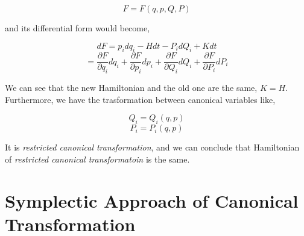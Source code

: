 \documentclass[12pt]{article}
\begin{document}
\begin{center}
    \[ F = F(q, p, Q, P) \]
\end{center}

and its differential form would become,

\begin{center}
    \[ dF = p_idq_i - Hdt - P_idQ_i + Kdt \]
    \[ = \frac{\partial F}{\partial q_i}dq_i + \frac{\partial F}{\partial p_i}dp_i + \frac{\partial F}{\partial Q_i}dQ_i + \frac{\partial F}{\partial P_i}dP_i \]
\end{center}

We can see that the new Hamiltonian and the old one are the same, $K = H$. Furthermore, we have the trasformation between canonical variables like,

\begin{center}
    \[ Q_i = Q_i(q, p) \]
    \[ P_i = P_i(q, p) \]
\end{center}

It is \textit{restricted canonical transformation}, and we can conclude that Hamiltonian of \textit{restricted canonical transformatoin} is the same.

\section{Symplectic Approach of Canonical Transformation}
\end{document}
